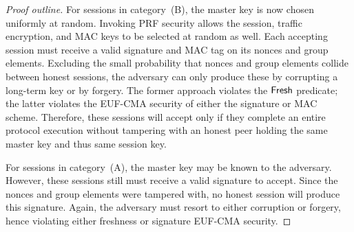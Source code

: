 \begin{proof}[Proof outline]
For sessions in category~(B), the master key is now chosen uniformly at random.
Invoking PRF security allows the session, traffic encryption, and MAC keys to be selected at random as well.
Each accepting session must receive a valid signature and MAC tag on its nonces and group elements.
Excluding the small probability that nonces and group elements collide between honest sessions, the adversary can only produce these by corrupting a long-term key or by forgery.
The former approach violates the $\mathsf{Fresh}$ predicate; the latter violates the EUF-CMA security of either the signature or MAC scheme.
Therefore, these sessions will accept only if they complete an entire protocol execution without tampering with an honest peer holding the same master key and thus same session key.

For sessions in category~(A), the master key may be known to the adversary.
However, these sessions still must receive a valid signature to accept.
Since the nonces and group elements were tampered with, no honest session will produce this signature.
Again, the adversary must resort to either corruption or forgery, hence violating either freshness or signature EUF-CMA security.
\end{proof}
\fi

